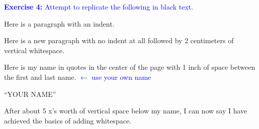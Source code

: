 \documentclass[]{article}
\newcommand{\BlueText}[1]{\textcolor{blue}{#1}}
\begin{document}
\noindent \BlueText{\textbf{Exercise 4:} Attempt to replicate the
following in black text.}
\vspace{1cm}

Here is a paragraph with an indent.

\noindent Here is a new paragraph with no indent at all followed by 2
centimeters of vertical whitespace.

\vspace{2cm}

Here is my name in quotes in the center of the page with 1 inch of
space between the first and last name. \BlueText{$\leftarrow$ use your
own name}

\begin{center}
	``YOUR \hspace{1in} NAME''
\end{center}

\vspace{5ex}

After about 5 x's worth of vertical space below my name, I can now say
I have achieved the basics of adding whitespace.
\end{document}
